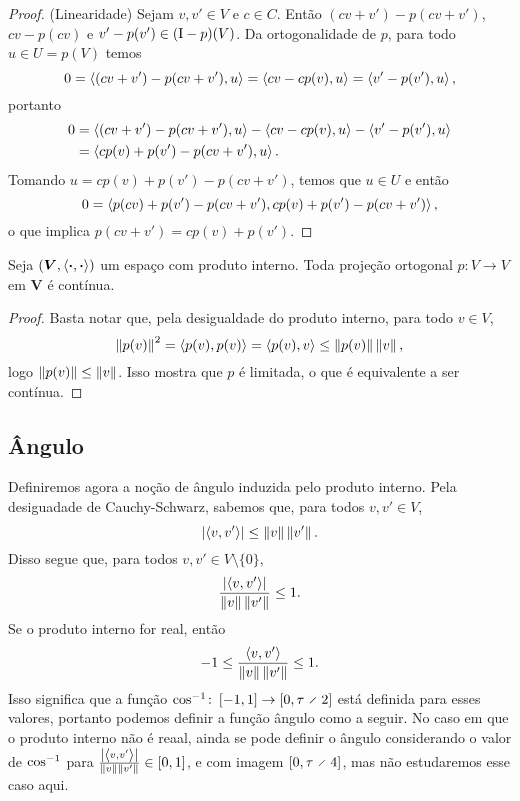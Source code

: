 \begin{proof}
(Linearidade) Sejam $v,v' \in V$ e $c \in C$. Então $(cv+v')-p(cv+v')$, $cv-p(cv)$ e $v'-p(v') \in (\mathrm{I}-p)(V)$. Da ortogonalidade de $p$, para todo $u \in U=p(V)$ temos
	\begin{equation*}
	0 = \left\langle{(cv+v')-p(cv+v')},{u}\right\rangle = \left\langle{cv-cp(v)},{u}\right\rangle = \left\langle{v'-p(v')},{u}\right\rangle,
	\end{equation*}
portanto
	\begin{align*}
	0 &= \left\langle{(cv+v')-p(cv+v')},{u}\right\rangle - \left\langle{cv-cp(v)},{u}\right\rangle - \left\langle{v'-p(v')},{u}\right\rangle \\
		&= \left\langle{cp(v) + p(v') - p(cv+v')},{u}\right\rangle.
	\end{align*}
Tomando $u=cp(v) + p(v') - p(cv+v')$, temos que $u \in U$ %
e então
 	\begin{equation*}
 	0 = \left\langle{p(cv) + p(v') - p(cv+v')},{cp(v) + p(v') - p(cv+v')}\right\rangle,
 	\end{equation*}
o que implica $p(cv+v') = cp(v) + p(v')$.
\end{proof}

\begin{proposition}
Seja $(\bm V, \left\langle{\bm{\cdot}},{\bm{\cdot}}\right\rangle)$ um espaço com produto interno. Toda projeção ortogonal $p\colon V \to V$ em $\bm V$ é contínua.
\end{proposition}
\begin{proof}
Basta notar que, pela desigualdade do produto interno, para todo $v \in V$,
	\begin{equation*}
	\left\Vert{p(v)}\right\Vert^2 = \left\langle{p(v)},{p(v)}\right\rangle = \left\langle{p(v)},{v}\right\rangle \leq \left\Vert{p(v)}\right\Vert\left\Vert{v}\right\Vert,
	\end{equation*}
logo $\left\Vert{p(v)}\right\Vert \leq \left\Vert{v}\right\Vert$. Isso mostra que $p$ é limitada, o que é equivalente a ser contínua.
\end{proof}




\subsection{Ângulo}

Definiremos agora a noção de ângulo induzida pelo produto interno. Pela desiguadade de Cauchy-Schwarz, sabemos que, para todos $v,v' \in V$,
	\begin{equation*}
	\left\vert{\left\langle{v},{v'}\right\rangle}\right\vert \leq \left\Vert{v}\right\Vert\left\Vert{v'}\right\Vert.
	\end{equation*}
Disso segue que, para todos $v,v' \in V\setminus\{0\}$,
	\begin{equation*}
	\frac{\left\vert{\left\langle{v},{v'}\right\rangle}\right\vert}{\left\Vert{v}\right\Vert\left\Vert{v'}\right\Vert} \leq 1.
	\end{equation*}
Se o produto interno for real, então
	\begin{equation*}
	-1 \leq \frac{\left\langle{v},{v'}\right\rangle}{\left\Vert{v}\right\Vert\left\Vert{v'}\right\Vert} \leq 1.
	\end{equation*}
Isso significa que a função $\cos\inv\colon \intff{-1}{1} \to \intff{0}{\tau \div 2}$ está definida para esses valores, portanto podemos definir a função ângulo como a seguir. No caso em que o produto interno não é reaal, ainda se pode definir o ângulo considerando o valor de $\cos^{-1}$ para $\frac{\left\vert{\left\langle{v},{v'}\right\rangle}\right\vert}{\left\Vert{v}\right\Vert\left\Vert{v'}\right\Vert}\in \left[{0},{1}\right]$, e com imagem $\intff{0}{\tau \div 4}$, mas não estudaremos esse caso aqui.

